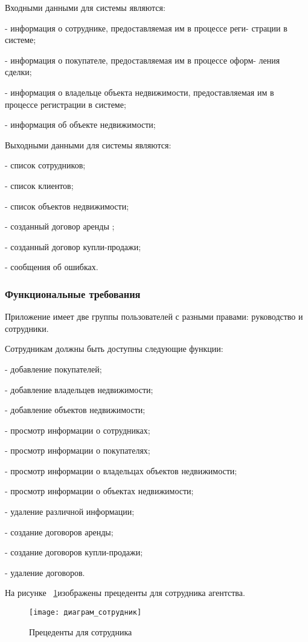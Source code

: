 Входными данными для системы являются:

-	информация о сотруднике, предоставляемая им в процессе реги- страции в системе;

-	информация о покупателе, предоставляемая им в процессе оформ- ления сделки;

-	информация о владельце объекта недвижимости, предоставляемая им в процессе регистрации в системе;

-	информация об объекте недвижимости;

Выходными данными для системы являются:

-	список сотрудников;

-	список клиентов;

-	список объектов недвижимости;

-	созданный договор аренды ;

-	созданный договор купли-продажи;

-	сообщения об ошибках.


\subsubsection{Функциональные требования}

Приложение имеет две группы пользователей с разными правами: руководство и сотрудники.

Сотрудникам должны быть доступны следующие функции:

-	добавление покупателей;

-	добавление владельцев недвижимости;

-	добавление объектов недвижимости;

-	просмотр информации о сотрудниках;

-	просмотр информации о покупателях;

-	просмотр информации о владельцах объектов недвижимости;

-	просмотр информации о объектах недвижимости;

-	удаление  различной информации;

-	создание договоров аренды;

-	создание договоров купли-продажи;

-	удаление договоров.

На рисунке ~\ref{user_precedent_diagram:image}изображены прецеденты для сотрудника агентства.

\begin{figure}[H]
	\texttt{[image: диаграм\_сотрудник]}
	\caption{Прецеденты для сотрудника}
	\label{user_precedent_diagram:image}
\end{figure}

